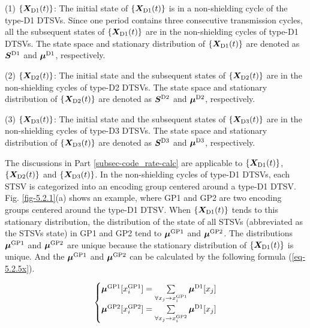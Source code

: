 \documentclass[lettersize,journal]{IEEEtran}
\begin{document}
(1) $\{\boldsymbol{X}_{\rm D1}(t)\}$: The initial state of $\{\boldsymbol{X}_{\rm D1}(t)\}$ is in a non-shielding cycle of the type-D1 DTSVs. Since one period contains three consecutive transmission cycles, all the subsequent states of $\{\boldsymbol{X}_{\rm D1}(t)\}$ are in the non-shielding cycles of type-D1 DTSVs. The state space and stationary distribution of $\{\boldsymbol{X}_{\rm D1}(t)\}$ are denoted as $\boldsymbol{S}^{\rm D1}$ and $\boldsymbol{\mu}^{\rm D1}$, respectively.

(2) $\{\boldsymbol{X}_{\rm D2}(t)\}$: The initial state and the subsequent states of $\{\boldsymbol{X}_{\rm D2}(t)\}$ are in the non-shielding cycles of type-D2 DTSVs. The state space and stationary distribution of $\{\boldsymbol{X}_{\rm D2}(t)\}$ are denoted as $\boldsymbol{S}^{\rm D2}$ and $\boldsymbol{\mu}^{\rm D2}$, respectively.

(3) $\{\boldsymbol{X}_{\rm D3}(t)\}$: The initial state and the subsequent states of $\{\boldsymbol{X}_{\rm D3}(t)\}$ are in the non-shielding cycles of type-D3 DTSVs. The state space and stationary distribution of $\{\boldsymbol{X}_{\rm D3}(t)\}$ are denoted as $\boldsymbol{S}^{\rm D3}$ and $\boldsymbol{\mu}^{\rm D3}$, respectively.

The discussions in Part \ref{subsec-code_rate-calc} are applicable to $\{\boldsymbol{X}_{\rm D1}(t)\}$, $\{\boldsymbol{X}_{\rm D2}(t)\}$ and $\{\boldsymbol{X}_{\rm D3}(t)\}$. In the non-shielding cycles of type-D1 DTSVs, each STSV is categorized into an encoding group centered around a type-D1 DTSV. Fig. \ref{fig-5.2.1}(a) shows an example, where GP1 and GP2 are two encoding groups centered around the type-D1 DTSV. When  $\{\boldsymbol{X}_{\rm D1}(t)\}$ tends to this stationary distribution, the distribution of the state of all STSVs (abbreviated as the STSVs state) in GP1 and GP2 tend to $\boldsymbol{\mu}^{\rm GP1}$ and $\boldsymbol{\mu}^{\rm GP2}$. The distributions $\boldsymbol{\mu}^{\rm GP1}$ and $\boldsymbol{\mu}^{\rm GP2}$ are unique because the stationary distribution of $\{\boldsymbol{X}_{\rm D1}(t)\}$ is unique. And the $\boldsymbol{\mu}^{\rm GP1}$ and $\boldsymbol{\mu}^{\rm GP2}$ can be calculated by the following formula (\ref{eq-5.2.5x}).

\begin{equation}
	\begin{aligned}
		\left\{ 
		\begin{matrix}
			\boldsymbol{\mu}^{\rm GP1}[x_i^{\rm GP1}] = \sum\limits_{\forall x_j \to x_i^{\rm GP1}}^{} \boldsymbol{\mu}^{\rm D1}[x_j] \\
			\boldsymbol{\mu}^{\rm GP2}[x_i^{\rm GP2}] = \sum\limits_{\forall x_j \to x_i^{\rm GP2}}^{} \boldsymbol{\mu}^{\rm D1}[x_j]
			\label{eq-5.2.5x}
		\end{matrix}
		\right.
	\end{aligned}
\end{equation}
\end{document}
